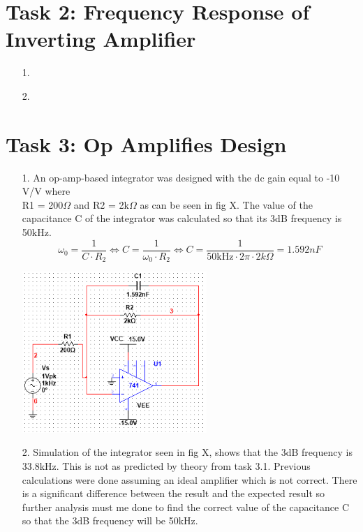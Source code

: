 \documentclass[11pt,a4paper]{article}
\begin{document}
\section*{Task 2: Frequency Response of Inverting Amplifier}

\begin{enumerate}
  \item[1.]
  
  \item[2.]
  
\end{enumerate}
\pagebreak
\section*{Task 3: Op Amplifies Design}

\begin{enumerate}
  \item[1.]
  An op-amp-based integrator was designed with the dc gain equal to -10 V/V where \\R1 = 200$\Omega$ and R2 = 2k$\Omega$ as can be seen in fig X. The value of the capacitance C of the integrator was calculated so that its 3dB frequency is 50kHz. %
$$\omega_0 = \frac{1}{C\cdot R_2} \Leftrightarrow C = \frac{1}{\omega_0 \cdot R_2} \Leftrightarrow C  = \frac{1}{50\text{kHz}\cdot 2\pi \cdot 2k\Omega} = 1.592 nF $$
  \begin{minipage}{\linewidth}
    	\centering       
        \includegraphics[width=7cm]{Task3_1.png}
    \end{minipage}
  \item[2.]
  Simulation of the integrator seen in fig X, shows that the 3dB frequency is 33.8kHz. This is not as predicted by theory from task 3.1. Previous calculations were done assuming an ideal amplifier which is not correct. There is a significant difference between the result and the expected result so further analysis must me done to find the correct value of the capacitance C so that the 3dB frequency will be 50kHz.\\

\end{enumerate}
\end{document}
